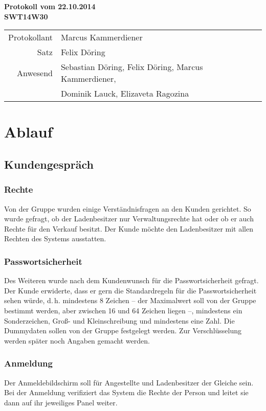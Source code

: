\documentclass{scrartcl}
\begin{document}
\begin{center}
\LARGE \bf{Protokoll vom 22.10.2014 \\
SWT14W30}
\end{center}

\begin{tabular}{rp{10cm}}
Protokollant & Marcus Kammerdiener \\
Satz & Felix Döring \\
Anwesend & Sebastian Döring, Felix Döring, Marcus Kammerdiener,\\
& Dominik Lauck, Elizaveta Ragozina \\
\end{tabular}

\vspace*{3em}

\section{Ablauf}
\subsection{Kundengespr\"ach}
\subsubsection{Rechte}
Von der Gruppe wurden einige Verständnisfragen an den Kunden gerichtet. So wurde gefragt, ob der Ladenbesitzer nur Verwaltungsrechte hat oder ob er auch Rechte für den Verkauf besitzt. Der Kunde möchte den Ladenbesitzer mit allen Rechten des Systems ausstatten.
\subsubsection{Passwortsicherheit}
Des Weiteren wurde nach dem Kundenwunsch für die Passwortsicherheit gefragt. Der Kunde erwiderte, dass er gern die Standardregeln für die Passwortsicherheit sehen würde, d.\,h. mindestens 8 Zeichen -- der Maximalwert soll von der Gruppe bestimmt werden, aber zwischen 16 und 64 Zeichen liegen --, mindestens ein Sonderzeichen, Groß- und Kleinschreibung und mindestens eine Zahl. Die Dummydaten sollen von der Gruppe festgelegt werden. Zur Verschlüsselung werden später noch Angaben gemacht werden.
\subsubsection{Anmeldung}
Der Anmeldebildschirm soll für Angestellte und Ladenbesitzer der Gleiche sein. Bei der Anmeldung verifiziert das System die Rechte der Person und leitet sie dann auf ihr jeweiliges Panel weiter.
\end{document}
